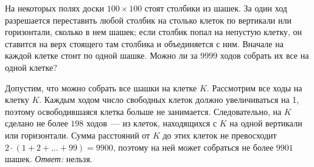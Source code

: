 На некоторых полях доски $100 \times 100$ стоят столбики из шашек.
За один ход разрешается переставить любой столбик на столько клеток по
вертикали или горизонтали, сколько в нем шашек;
если столбик попал на непустую клетку, он ставится на верх стоящего там
столбика и объединяется с ним.
Вначале на каждой клетке стоит по одной шашке.
Можно ли за $9999$ ходов собрать их все на одной клетке?

\solution
Допустим, что можно собрать все шашки на клетке $K$.
Рассмотрим все ходы на клетку $K$.
Каждым ходом число свободных клеток должно увеличиваться на 1, поэтому
освободившаяся клетка больше не занимается.
Следовательно, на $K$ сделано не более $198$ ходов~--- из клеток, находящихся
с $K$ на одной вертикали или горизонтали.
Сумма расстояний от $K$ до этих клеток не превосходит
$2 \cdot (1 + 2 + \ldots + 99) = 9900$,
поэтому на ней может собраться не более $9901$ шашек.
\emph{Ответ:} нельзя.

